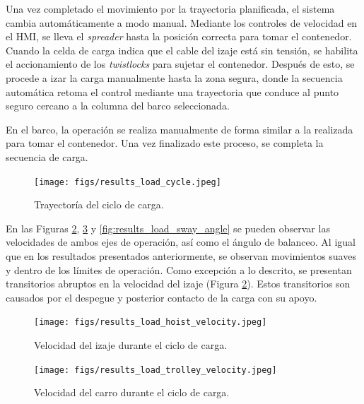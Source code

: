 \documentclass{article}
\begin{document}
            Una vez completado el movimiento por la trayectoria planificada, el sistema cambia automáticamente a modo manual. Mediante los controles de velocidad en el HMI, se lleva el \textit{spreader} hasta la posición correcta para tomar el contenedor. Cuando la celda de carga indica que el cable del izaje está sin tensión, se habilita el accionamiento de los \textit{twistlocks} para sujetar el contenedor. Después de esto, se procede a izar la carga manualmente hasta la zona segura, donde la secuencia automática retoma el control mediante una trayectoria que conduce al punto seguro cercano a la columna del barco seleccionada.

            En el barco, la operación se realiza manualmente de forma similar a la realizada para tomar el contenedor. Una vez finalizado este proceso, se completa la secuencia de carga.

            \begin{figure} [H]
                \centering
                \texttt{[image: figs/results\_load\_cycle.jpeg]}
                \caption{Trayectoría del ciclo de carga.}
                \label{fig:results_load_cycle}
            \end{figure}

            En las Figuras \ref{fig:results_load_hoist_velocity}, \ref{fig:results_load_trolley_velocity} y \ref{fig:results_load_sway_angle} se pueden observar las velocidades de ambos ejes de operación, así como el ángulo de balanceo. Al igual que en los resultados presentados anteriormente, se observan movimientos suaves y dentro de los límites de operación. Como excepción a lo descrito, se presentan transitorios abruptos en la velocidad del izaje (Figura \ref{fig:results_load_hoist_velocity}). Estos transitorios son causados por el despegue y posterior contacto de la carga con su apoyo. 
            
            \begin{figure} [H]
                \centering
                \texttt{[image: figs/results\_load\_hoist\_velocity.jpeg]}
                \caption{Velocidad del izaje durante el ciclo de carga.}
                \label{fig:results_load_hoist_velocity}
            \end{figure}

            \begin{figure} [H]
                \centering
                \texttt{[image: figs/results\_load\_trolley\_velocity.jpeg]}
                \caption{Velocidad del carro durante el ciclo de carga.}
                \label{fig:results_load_trolley_velocity}
            \end{figure}
\end{document}
